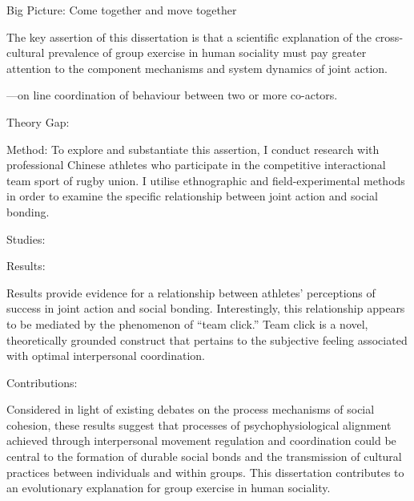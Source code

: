 
Big Picture: Come together and move together

The key assertion of this dissertation is that a scientific explanation of the cross-cultural prevalence of group exercise in human sociality must pay greater attention to the component mechanisms and system dynamics of joint action.

---on line coordination of behaviour between two or more co-actors.


Theory Gap:



Method:
To explore and substantiate this assertion, I conduct research with professional Chinese athletes who participate in the competitive interactional team sport of rugby union.  I utilise ethnographic and field-experimental methods in order to examine the specific relationship between joint action and social bonding.

Studies:



Results:

Results provide evidence for a relationship between athletes' perceptions of success in joint action and social bonding.
 Interestingly, this relationship appears to be mediated by the phenomenon of ``team click.''  Team click is a novel, theoretically grounded construct that pertains to the subjective feeling associated with optimal interpersonal coordination.


Contributions:

 Considered in light of existing debates on the process mechanisms of social cohesion, these results suggest that processes of psychophysiological alignment achieved through interpersonal movement regulation and coordination could be central to the formation of durable social bonds and the transmission of cultural practices between individuals and within groups.  This dissertation contributes to an evolutionary explanation for group exercise in human sociality.
